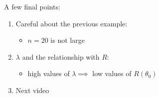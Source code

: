 A few final points:
\begin{enumerate}[label=(\roman*)]
    \item Careful about the previous example:
          \begin{itemize}
              \item $ n=20 $ is not large
          \end{itemize}
    \item $ \lambda $ and the relationship with $ R $:
          \begin{itemize}
              \item high values of $ \lambda\implies $ low values of $ R(\theta_0) $
          \end{itemize}
    \item Next video
\end{enumerate}

